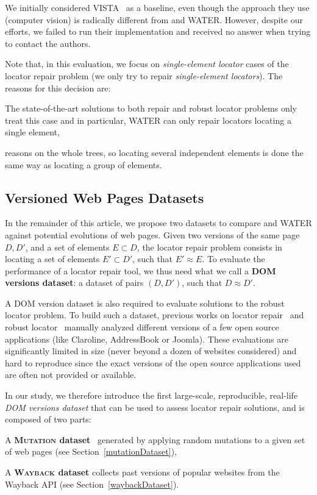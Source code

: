 We initially considered VISTA~\cite{stocco2018visual} as a baseline, even though the approach they use (computer vision) is radically different from \erratum{} and WATER.
However, despite our efforts, we failed to run their implementation and received no answer when trying to contact the authors. 

Note that, in this evaluation, we focus on \textit{single-element locator} cases of the locator repair problem (we only try to repair \textit{single-element locators}).
The reasons for this decision are:
\begin{inparaenum}
    \item The state-of-the-art solutions to both repair and robust locator problems only treat this case and in particular, WATER can only repair locators locating a single element,
    \item \erratum{} reasons on the whole trees, so locating several independent elements is done the same way as locating a group of elements.
\end{inparaenum}

\subsection{Versioned Web Pages Datasets}
In the remainder of this article, we propose two datasets to compare \erratum{} and WATER against potential evolutions of web pages.
Given two versions of the same page $D, D'$, and a set of elements $E \subset D$, the locator repair problem consists in locating a set of elements $E' \subset D'$, such that $E' \approx E$.
To evaluate the performance of a locator repair tool, we thus need what we call a \textbf{DOM versions dataset}: a dataset of pairs $(D, D')$, such that $D \approx D'$.

A DOM version dataset is also required to evaluate solutions to the robust locator problem.
To build such a dataset, previous works on locator repair~\cite{leotta2016robula+,leotta2014reducing} and robust locator~\cite{stocco2018visual,choudhary2011water,hammoudi2016waterfall} manually analyzed different versions of a few open source applications (like Claroline, AddressBook or Joomla).
These evaluations are significantly limited in size (never beyond a dozen of websites considered) and hard to reproduce since the exact versions of the open source applications used are often not provided or available.

In our study, we therefore introduce the first large-scale, reproducible, real-life \textit{DOM versions dataset} that can be used to assess locator repair solutions, and is composed of two parts:
\begin{compactenum}
    \item A {\bf \textsc{Mutation} dataset}~\cite{brisset2020sftm} generated by applying random mutations to a given set of web pages (see Section~\ref{mutationDataset}),
    \item A {\bf \textsc{Wayback} dataset} collects past versions of popular websites from the Wayback API (see Section~\ref{waybackDataset}).
\end{compactenum}

